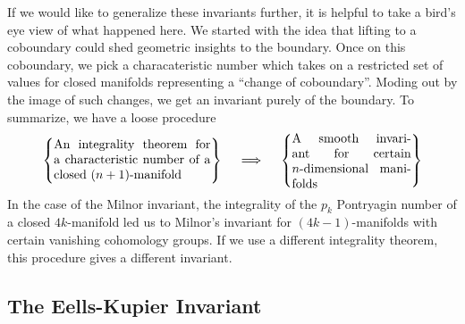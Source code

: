 If we would like to generalize these invariants further, it is helpful to take a bird's eye view of what happened here. We started with the idea that lifting to a coboundary could shed geometric insights to the boundary. Once on this coboundary, we pick a characateristic number which takes on a restricted set of values for closed manifolds representing a ``change of coboundary''. Moding out by the image of such changes, we get an invariant purely of the boundary. To summarize, we have a loose procedure
\[
	\left\{\parbox{12.5em}{An integrality theorem for a characteristic number of a closed $(n+1)$-manifold}\right\}
	\quad\implies \quad
	\left\{\parbox{9.5em}{A smooth invariant for certain $n$-dimensional manifolds}\right\}
\]
In the case of the Milnor invariant, the integrality of the $p_k$ Pontryagin number of a closed $4k$-manifold led us to Milnor's invariant for $(4k-1)$-manifolds with certain vanishing cohomology groups. 
If we use a different integrality theorem, this procedure gives a different invariant.

\subsection{The Eells-Kupier Invariant}\label{sec:eells-kupier-invariant}
